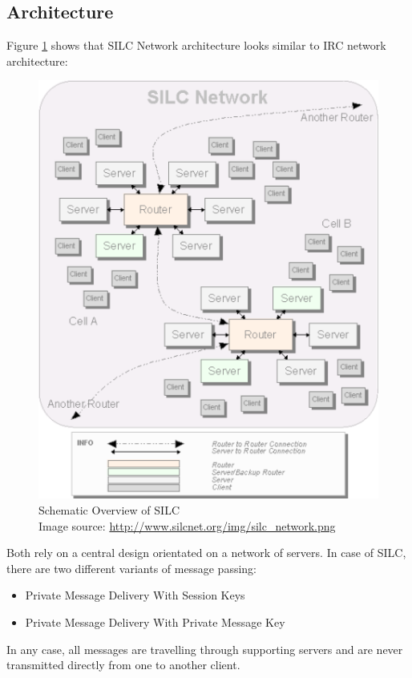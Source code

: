 \subsection{Architecture}
Figure \ref{silcoverview} shows 
that SILC Network architecture looks similar to IRC network architecture: 
\begin{figure}
    \centering
    \caption[Schematic Overview of SILC]{Schematic Overview of SILC\\Image source: \protect\url{http://www.silcnet.org/img/silc_network.png}}
    \label{silcoverview}
    \includegraphics[scale=0.8]{silc_network.png}
\end{figure}
Both rely on a central design orientated on a network of servers.
In case of SILC, there are two different variants of message passing:
\begin{itemize}
\item Private Message Delivery With Session Keys
\item Private Message Delivery With Private Message Key
\end{itemize}
In any case, all messages are travelling through supporting servers and are never
transmitted directly from one to another client.
